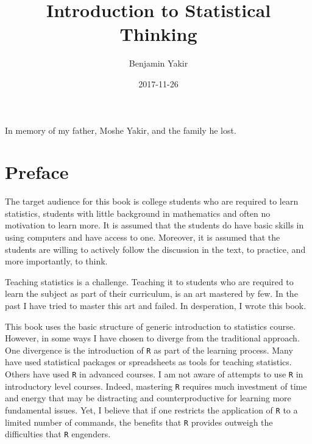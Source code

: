 \documentclass[]{krantz}
\title{Introduction to Statistical Thinking}
\author{Benjamin Yakir}
\date{2017-11-26}
\theoremstyle{definition}
\theoremstyle{definition}
\theoremstyle{definition}
\theoremstyle{remark}
\begin{document}
\maketitle


\thispagestyle{empty}

\begin{center}
In memory of my father, Moshe Yakir, and the family he lost.
\end{center}

\setlength{\abovedisplayskip}{-5pt}
\setlength{\abovedisplayshortskip}{-5pt}

{
\hypersetup{linkcolor=black}
\setcounter{tocdepth}{2}
\tableofcontents
}
\chapter*{Preface}\label{preface}


The target audience for this book is college students who are required
to learn statistics, students with little background in mathematics and
often no motivation to learn more. It is assumed that the students do
have basic skills in using computers and have access to one. Moreover,
it is assumed that the students are willing to actively follow the
discussion in the text, to practice, and more importantly, to think.

Teaching statistics is a challenge. Teaching it to students who are
required to learn the subject as part of their curriculum, is an art
mastered by few. In the past I have tried to master this art and failed.
In desperation, I wrote this book.

This book uses the basic structure of generic introduction to statistics
course. However, in some ways I have chosen to diverge from the
traditional approach. One divergence is the introduction of \texttt{R}
as part of the learning process. Many have used statistical packages or
spreadsheets as tools for teaching statistics. Others have used
\texttt{R} in advanced courses. I am not aware of attempts to use
\texttt{R} in introductory level courses. Indeed, mastering \texttt{R}
requires much investment of time and energy that may be distracting and
counterproductive for learning more fundamental issues. Yet, I believe
that if one restricts the application of \texttt{R} to a limited number
of commands, the benefits that \texttt{R} provides outweigh the
difficulties that \texttt{R} engenders.
\end{document}
